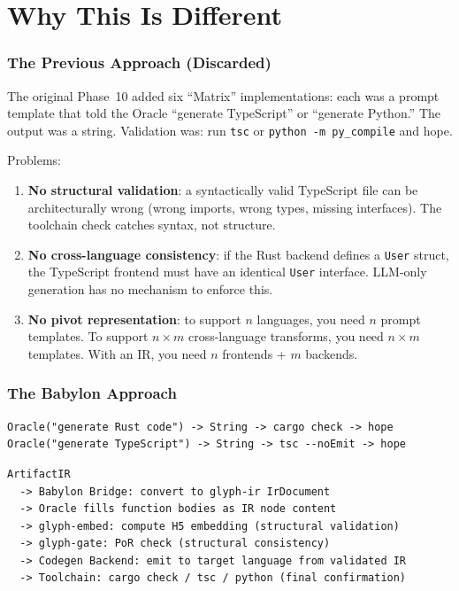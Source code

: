 \documentclass[11pt,a4paper,twoside]{article}
\theoremstyle{definition}
\theoremstyle{plain}
\theoremstyle{remark}
\begin{document}
\tableofcontents
\newpage


\part{Why This Is Different}\label{part:why}

\section{The Previous Approach (Discarded)}\label{sec:old}

The original Phase~10 added six ``Matrix'' implementations: each was
a prompt template that told the Oracle ``generate TypeScript'' or
``generate Python.'' The output was a string. Validation was: run
\texttt{tsc} or \texttt{python -m py\_compile} and hope.

Problems:
\begin{enumerate}[nosep]
  \item \textbf{No structural validation}: a syntactically valid
        TypeScript file can be architecturally wrong (wrong imports,
        wrong types, missing interfaces). The toolchain check catches
        syntax, not structure.
  \item \textbf{No cross-language consistency}: if the Rust backend
        defines a \texttt{User} struct, the TypeScript frontend must
        have an identical \texttt{User} interface. LLM-only generation
        has no mechanism to enforce this.
  \item \textbf{No pivot representation}: to support $n$ languages, you
        need $n$ prompt templates. To support $n \times m$
        cross-language transforms, you need $n \times m$ templates.
        With an IR, you need $n$ frontends + $m$ backends.
\end{enumerate}

\section{The Babylon Approach}\label{sec:new}

\begin{lstlisting}[title={Previous: String-based}]
Oracle("generate Rust code") -> String -> cargo check -> hope
Oracle("generate TypeScript") -> String -> tsc --noEmit -> hope
\end{lstlisting}

\begin{lstlisting}[title={Revised: IR-based}]
ArtifactIR
  -> Babylon Bridge: convert to glyph-ir IrDocument
  -> Oracle fills function bodies as IR node content
  -> glyph-embed: compute H5 embedding (structural validation)
  -> glyph-gate: PoR check (structural consistency)
  -> Codegen Backend: emit to target language from validated IR
  -> Toolchain: cargo check / tsc / python (final confirmation)
\end{lstlisting}
\end{document}
